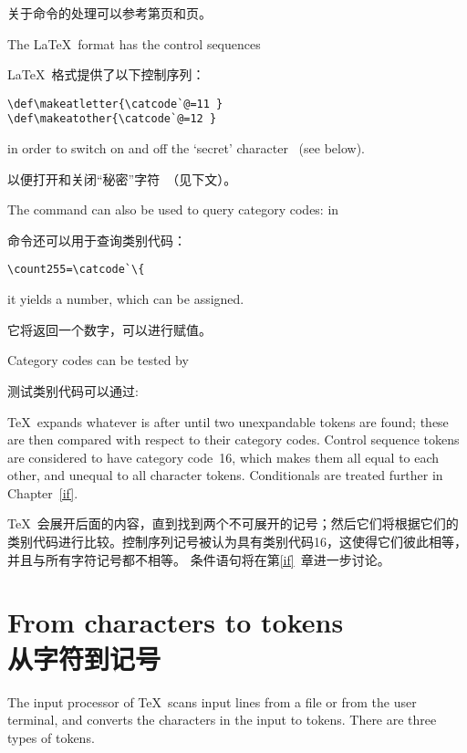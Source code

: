 关于命令的处理可以参考第\pageref{chardef}页和\pageref{num:chardef}页。


The \LaTeX\ format has the control sequences

\LaTeX\ 格式提供了以下控制序列：
\begin{verbatim}
\def\makeatletter{\catcode`@=11 }
\def\makeatother{\catcode`@=12 }
\end{verbatim}
in order to switch on and off the `secret' character~\n@
(see below).
\awp

以便打开和关闭“秘密”字符~\n@（见下文）。
\awp

      

The  command can also be used to query category
codes: in 

命令还可以用于查询类别代码：\begin{verbatim}
\count255=\catcode`\{
\end{verbatim}
it yields a number, which can be assigned.

它将返回一个数字，可以进行赋值。

Category codes can be tested by

测试类别代码可以通过:
\begin{disp}\end{disp}
\TeX\ expands whatever is after  until two 
unexpandable tokens are found; these are then compared
with respect to their category codes. Control sequence
tokens are considered to have category code~16,
which makes them all equal to each other, and unequal to
all character tokens.
Conditionals are treated further in Chapter~\ref{if}.

\TeX\ 会展开后面的内容，直到找到两个不可展开的记号；然后它们将根据它们的类别代码进行比较。控制序列记号被认为具有类别代码16，这使得它们彼此相等，并且与所有字符记号都不相等。
条件语句将在第\ref{if}~章进一步讨论。


\section{From characters to tokens\\从字符到记号}

The input processor
of \TeX\ scans input lines from a file or from the
user terminal, and converts the characters in the input
to tokens. There are three types of tokens.

